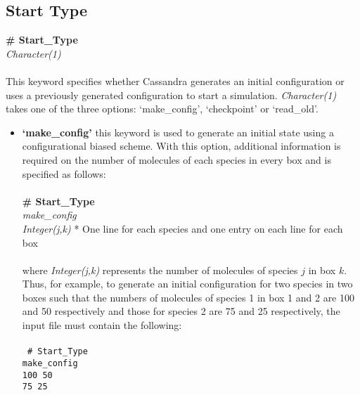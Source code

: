 \subsection{Start Type}\label{sec:Start_Type}
{\bf \# Start\_Type} \\
{\it Character(1) } \\ \\
%
This keyword specifies whether Cassandra generates an initial configuration or uses a previously generated configuration
to start a simulation. {\it Character(1)} takes one of the three options: `make\_config', `checkpoint' or `read\_old'. 
%
\begin{itemize} 
\item \textbf{`make\_config'} this keyword is used to generate an initial state using a configurational biased scheme. 
With this option, additional information is required on the number of molecules of each species in every box and is specified as follows: \\ \\
%
%
{\bf \# Start\_Type} \\
{\it make\_config} \\
{\it Integer(j,k)} * One line for each species and one entry on each line for each box\\ \\
% 
 where {\it Integer(j,k)} represents the number of molecules of species $j$ in box $k$. Thus, for example, to generate an initial configuration
 for two species in two boxes such that the numbers of molecules of species 1 in box 1 and 2 are 100 and 50 respectively and those for
 species 2 are 75 and 25 respectively, the input file must contain the following: \\ \\
 \texttt{
 \# Start\_Type \\
 make\_config \\
 100 50 \\
 75 25 \\}
%


\end{itemize}
